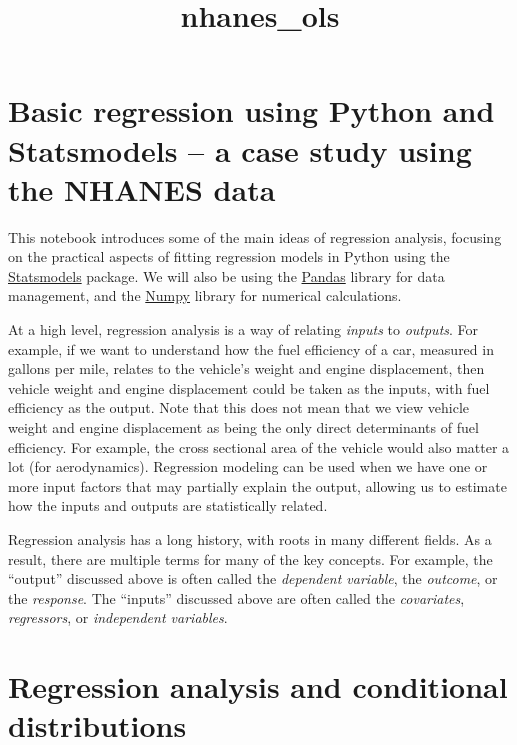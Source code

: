 \documentclass[11pt]{article}
\title{nhanes\_ols}
\begin{document}
    
    
    \maketitle
    
    

    
    \hypertarget{basic-regression-using-python-and-statsmodels-a-case-study-using-the-nhanes-data}{%
\section{Basic regression using Python and Statsmodels -- a case study
using the NHANES
data}\label{basic-regression-using-python-and-statsmodels-a-case-study-using-the-nhanes-data}}

    This notebook introduces some of the main ideas of regression analysis,
focusing on the practical aspects of fitting regression models in Python
using the \href{http://www.statsmodels.org}{Statsmodels} package. We
will also be using the \href{http://pandas.pydata.org}{Pandas} library
for data management, and the \href{http://www.numpy.org}{Numpy} library
for numerical calculations.

    At a high level, regression analysis is a way of relating \emph{inputs}
to \emph{outputs}. For example, if we want to understand how the fuel
efficiency of a car, measured in gallons per mile, relates to the
vehicle's weight and engine displacement, then vehicle weight and engine
displacement could be taken as the inputs, with fuel efficiency as the
output. Note that this does not mean that we view vehicle weight and
engine displacement as being the only direct determinants of fuel
efficiency. For example, the cross sectional area of the vehicle would
also matter a lot (for aerodynamics). Regression modeling can be used
when we have one or more input factors that may partially explain the
output, allowing us to estimate how the inputs and outputs are
statistically related.

    Regression analysis has a long history, with roots in many different
fields. As a result, there are multiple terms for many of the key
concepts. For example, the ``output'' discussed above is often called
the \emph{dependent variable}, the \emph{outcome}, or the
\emph{response}. The ``inputs'' discussed above are often called the
\emph{covariates}, \emph{regressors}, or \emph{independent variables}.

    \hypertarget{regression-analysis-and-conditional-distributions}{%
\section{Regression analysis and conditional
distributions}\label{regression-analysis-and-conditional-distributions}}
\end{document}
